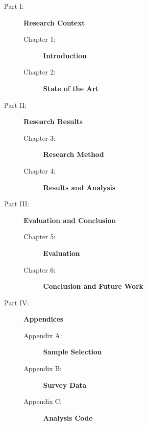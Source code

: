 \begin{description}
\item[Part I:] \textbf{Research Context}
    \begin{description}
    \item[Chapter 1:] \textbf{Introduction}
    \item[Chapter 2:] \textbf{State of the Art}
    \end{description}
\item[Part II:] \textbf{Research Results}
    \begin{description}
    \item[Chapter 3:] \textbf{Research Method}
    \item[Chapter 4:] \textbf{Results and Analysis}
    \end{description}
\item[Part III:] \textbf{Evaluation and Conclusion}
    \begin{description}
    \item[Chapter 5:] \textbf{Evaluation}
    \item[Chapter 6:] \textbf{Conclusion and Future Work}
    \end{description}
\item[Part IV:] \textbf{Appendices}
    \begin{description}
    \item[Appendix A:] \textbf{Sample Selection}
    \item[Appendix B:] \textbf{Survey Data}
    \item[Appendix C:] \textbf{Analysis Code}
    \end{description}
\end{description}

\cleardoublepage
